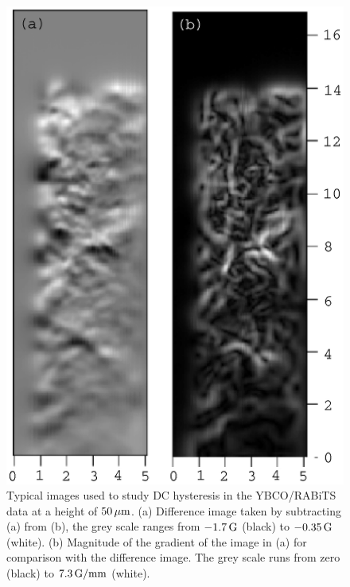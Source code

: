 %
\begin{figure}[p]
\includegraphics{figs/magpen/fig6b.ps}
\caption[DC hysteresis difference and gradient images of YBCO/RABiTS.]
{Typical images used to study DC hysteresis in the YBCO/RABiTS data
at a height of $50\,\mu\mathrm{m}$.
(a) Difference image taken by subtracting 
(a) from (b), the grey
scale ranges from $-1.7\,\mathrm{G}$ (black) to $-0.35\,\mathrm{G}$ (white). 
(b) Magnitude of the gradient of the image in (a) for comparison 
with the difference image. The grey scale runs from zero (black) to
$7.3\,\mathrm{G}/\mathrm{mm}$ (white).
}
\label{fig:dc_hyst_gen_b}
\end{figure}

